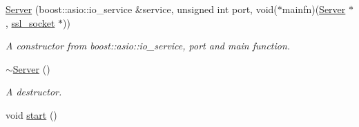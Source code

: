 \begin{DoxyCompactItemize}
\item 
\hyperlink{class_r_c_f_1_1_server_1_1_server_a75475bf21a8460ac35c472c6a886c61a}{Server} (boost\+::asio\+::io\+\_\+service \&service, unsigned int port, void($\ast$mainfn)(\hyperlink{class_r_c_f_1_1_server_1_1_server}{Server} $\ast$, \hyperlink{_server_8h_a099e2c9fff985800932f4c424a126989}{ssl\+\_\+socket} $\ast$))
\begin{DoxyCompactList}\small\item\em A constructor from boost\+::asio\+::io\+\_\+service, port and main function. \end{DoxyCompactList}\item 
\hypertarget{class_r_c_f_1_1_server_1_1_server_ab7f431a9386d410332f53922c17e442d}{}\hyperlink{class_r_c_f_1_1_server_1_1_server_ab7f431a9386d410332f53922c17e442d}{$\sim$\+Server} ()\label{class_r_c_f_1_1_server_1_1_server_ab7f431a9386d410332f53922c17e442d}

\begin{DoxyCompactList}\small\item\em A destructor. \end{DoxyCompactList}\item 
\hypertarget{class_r_c_f_1_1_server_1_1_server_ac3da2fc648c18271f5024a24fc141d5d}{}void \hyperlink{class_r_c_f_1_1_server_1_1_server_ac3da2fc648c18271f5024a24fc141d5d}{start} ()\label{class_r_c_f_1_1_server_1_1_server_ac3da2fc648c18271f5024a24fc141d5d}


\end{DoxyCompactItemize}
